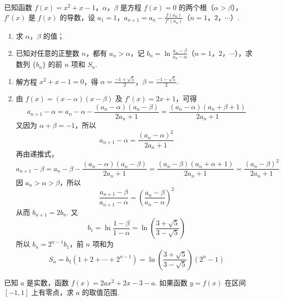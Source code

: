 \begin{problem}
已知函数 \(f(x) = x^2 + x - 1\)，\(\alpha\)，\(\beta\) 是方程 \(f(x) = 0\) 的两个根（\(\alpha > \beta\)），\(f'(x)\) 是 \(f(x)\) 的导数，设 \(a_{1} = 1\)，\(a_{n + 1} = a_{n} - \frac{f(a_{n})}{f'(a_{n})}\)（\(n = 1\)，\(2\)，\(\cdots\)）.

\begin{enumerate}
\item 求 \(\alpha\)，\(\beta\) 的值；
\item 已知对任意的正整数 \(n\)，都有 \(a_{n} > \alpha\)，记 \(b_{n} = \ln \frac{a_{n} - \beta}{a_{n} - \alpha}\)（\(n = 1\)，\(2\)，\(\cdots\)），求数列 \(\{b_{n}\}\) 的前 \(n\) 项和 \(S_{n}\).
\end{enumerate}
\end{problem}

\begin{solution}
\begin{enumerate}
\item 解方程 \(x^{2}+x-1=0\)，得
\(\alpha=\frac{-1+\sqrt{5}}{2}\)，\(\beta=\frac{-1-\sqrt{5}}{2}\).
\item 由 \(f(x)=(x-\alpha)(x-\beta)\) 及
\(f'(x)=2x+1\)，可得
\[
a_{n+1}-\alpha
=a_n-\alpha-\frac{(a_n-\alpha)(a_n-\beta)}{2a_n+1}
=\frac{(a_n-\alpha)(a_n+\beta+1)}{2a_n+1}
\]
又因为 \(\alpha+\beta=-1\)，所以
\[
a_{n+1}-\alpha=\frac{(a_n-\alpha)^2}{2a_n+1}
\]
再由递推式，
\[
a_{n+1}-\beta
=a_n-\beta-\frac{(a_n-\alpha)(a_n-\beta)}{2a_n+1}
=\frac{(a_n-\beta)(a_n+\alpha+1)}{2a_n+1}
=\frac{(a_n-\beta)^2}{2a_n+1}
\]
因 \(a_n>\alpha>\beta\)，所以
\[
\frac{a_{n+1}-\beta}{a_{n+1}-\alpha}
=\left(\frac{a_n-\beta}{a_n-\alpha}\right)^2
\]
从而 \(b_{n+1}=2b_n\). 又
\[
b_1=\ln\frac{1-\beta}{1-\alpha}
=\ln\left(\frac{3+\sqrt{5}}{3-\sqrt{5}}\right)
\]
所以 \(b_n=2^{n-1}b_1\)，前 \(n\) 项和为
\[
S_n=b_1(1+2+\cdots+2^{n-1})
=\ln\left(\frac{3+\sqrt{5}}{3-\sqrt{5}}\right)(2^n-1)
\]
\end{enumerate}
\end{solution}

\begin{problem}
已知 \(a\) 是实数，函数 \(f(x) = 2ax^2 + 2x - 3 - a\). 如果函数 \(y = f(x)\) 在区间 \([-1, 1]\) 上有零点，求 \(a\) 的取值范围.
\end{problem}

